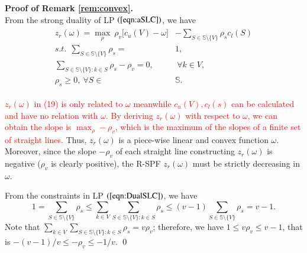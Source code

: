 \documentclass[authoryear,review,12pt]{elsarticle}
\begin{document}
\noindent \textbf{Proof of Remark \ref{rem:convex}.}\\
From the strong duality of LP $(\ref{eqn:aSLC})$, we have
\begin{eqnarray}\label{eqn:DualSLC}
\begin{aligned}
z_r(\omega) = \max_{\rho}~ \rho_v \big[ c_u(V)-\omega \big] &- \sum_{S \in \mathbb{S} \setminus \{V\}} \rho_s c_l(S)\\
s.t.~~\sum_{S \in \mathbb{S} \setminus \{V\}} \rho_s = &1,\\
\sum_{S \in \mathbb{S} \setminus \{V\}: k \in S} \rho_s - \rho_v = 0,&~\forall k \in V,\\
\rho_s \geq 0,~\forall S \in& \mathbb{S}.
\end{aligned}
\end{eqnarray}

\textcolor{red}{$z_r(\omega)$ in (19) is only related to $\omega$ meanwhile $c_u(V), c_l(s)$ can be calculated and have no relation with $\omega$. By deriving $z_r(\omega)$ with respect to $\omega$, we can obtain the slope is $\max_\rho -\rho_v$, which is the maximum of the slopes of a finite set of straight lines.}
Thus, $z_r(\omega)$ is a piece-wise linear and convex function  $\omega$.
Moreover, since the slope $-\rho_v$ of each straight line constructing $z_r(\omega)$ is negative ($\rho_v$ is clearly positive), the R-SPF $z_r(\omega)$ must be strictly decreasing in $\omega$.

From the constraints in LP $(\ref{eqn:DualSLC})$, we have
$$
1 = \sum_{S \in \mathbb{S} \setminus \{V\}} \rho_s \leq \sum_{k \in V}\sum_{S \in \mathbb{S} \setminus \{V\}: k \in S} \rho_s \leq (v-1)\sum_{S \in \mathbb{S} \setminus \{V\}} \rho_s = v-1.
$$
Note that $\sum_{k \in V}\sum_{S \in \mathbb{S} \setminus \{V\}: k \in S} \rho_s = v\rho_v$; therefore, we have $1 \leq v\rho_v \leq v-1$, that is $-(v-1)/v\leq -\rho_v \leq -1/v$.
\qed
\end{document}
